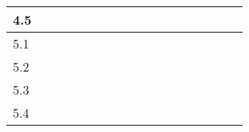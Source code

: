 \begin{table}[H]
{\begin{tabular}{|l|l|l|l|l|l|l|l|l|l|l|l|l|l|l|l|l|}
4.5       &                          &                                                 &                          &                          &                          &                          & \cellcolor[HTML]{000000} &                          &                                                 &                                                 &                                                 &                          &                          &                          &                          &                          \\ \hline
5.1       &                          &                                                 &                          &                          &                          &                          &                          & \cellcolor[HTML]{000000} &                                                 &                                                 &                                                 &                          &                          &                          &                          &                          \\ \hline
5.2       &                          &                                                 &                          &                          &                          &                          &                          & \cellcolor[HTML]{000000} &                                                 &                                                 &                                                 &                          &                          &                          &                          &                          \\ \hline
5.3       &                          &                                                 &                          &                          &                          &                          &                          &                          & \cellcolor[HTML]{000000}{\color[HTML]{000000} } &                                                 &                                                 &                          &                          &                          &                          &                          \\ \hline
5.4       &                          &                                                 &                          &                          &                          &                          &                          &                          & \cellcolor[HTML]{000000}{\color[HTML]{000000} } &                                                 &                                                 &                          &                          &                          &                          &                          \\ \hline

\end{tabular}}
\end{table}
